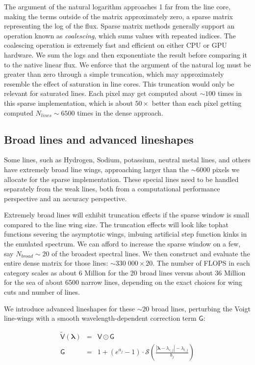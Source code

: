 \documentclass[modern]{aastex631}
\begin{document}
The argument of the natural logarithm approaches 1 far from the line core, making the terms outside of the matrix approximately zero, a sparse matrix representing the log of the flux. Sparse matrix methods generally support an operation known as \emph{coalescing}, which sums values with repeated indices. The coalescing operation is extremely fast and efficient on either CPU or GPU hardware. We sum the logs and then exponentiate the result before comparing it to the native linear flux. We enforce that the argument of the natural log must be greater than zero through a simple truncation, which may approximately resemble the effect of saturation in line cores. This truncation would only be relevant for saturated lines. Each pixel may get computed about $\sim100$ times in this sparse implementation, which is about $50\times$ better than each pixel getting computed $N_{lines}\sim6500$ times in the dense approach.


\subsection{Broad lines and advanced lineshapes}

Some lines, such as Hydrogen, Sodium, potassium, neutral metal lines, and others have extremely broad line wings, approaching larger than the $\sim6000$ pixels we allocate for the sparse implementation. These special lines need to be handled separately from the weak lines, both from a computational performance perspective and an accuracy perspective.

Extremely broad lines will exhibit truncation effects if the sparse window is small compared to the line wing size. The truncation effects will look like tophat functions severing the asymptotic wings, imbuing artificial step function kinks in the emulated spectrum. We can afford to increase the sparse window on a few, say $N_{broad}\sim20$ of the broadest spectral lines. We then construct and evaluate the entire dense matrix for those lines: $\sim 330\;000 \times 20$. The number of FLOPS in each category scales as about 6 Million for the 20 broad lines versus about 36 Million for the sea of about 6500 narrow lines, depending on the exact choices for wing cuts and number of lines.

We introduce advanced lineshapes for these $\sim20$ broad lines, perturbing the Voigt line-wings with a smooth wavelength-dependent correction term $\mathsf{G}$:

\begin{eqnarray}
 \mathsf{\tilde{V}(\bm{\lambda})} &=& \mathsf{V} \odot \mathsf{G}\\
 \mathsf{G} &=& 1 + (e^{a_j} - 1) \cdot \mathcal{S}\left(\frac{|\bm{\lambda}-\lambda_{c,j}| - \lambda_{t, j}}{b_j}\right)
\end{eqnarray}
\end{document}
